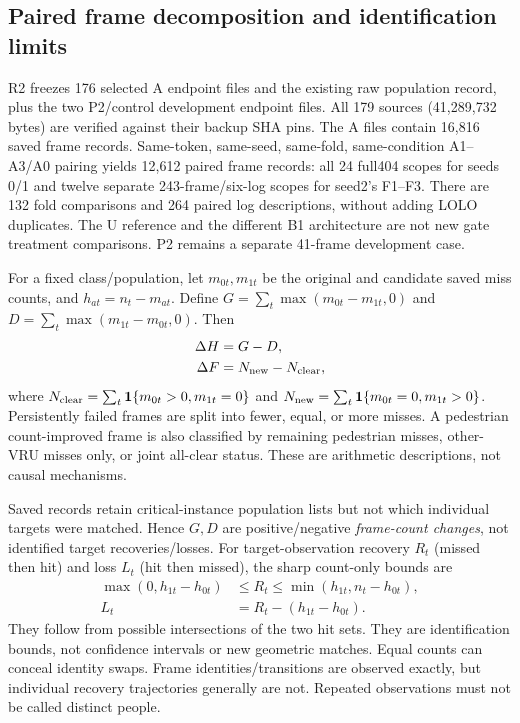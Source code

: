 \documentclass[conference]{IEEEtran}
\begin{document}
\subsection{Paired frame decomposition and identification limits}
R2 freezes 176 selected A endpoint files and the existing raw population record, plus the two P2/control development endpoint files. All 179 sources (41,289,732 bytes) are verified against their backup SHA pins. The A files contain 16,816 saved frame records. Same-token, same-seed, same-fold, same-condition A1--A3/A0 pairing yields 12,612 paired frame records: all 24 full404 scopes for seeds 0/1 and twelve separate 243-frame/six-log scopes for seed2's F1--F3. There are 132 fold comparisons and 264 paired log descriptions, without adding LOLO duplicates. The U reference and the different B1 architecture are not new gate treatment comparisons. P2 remains a separate 41-frame development case.

For a fixed class/population, let $m_{0t},m_{1t}$ be the original and candidate saved miss counts, and $h_{at}=n_t-m_{at}$. Define $G=\sum_t\max(m_{0t}-m_{1t},0)$ and $D=\sum_t\max(m_{1t}-m_{0t},0)$. Then
\begin{align}
\Delta H &= G-D,\\
\Delta F &= N_{\rm new}-N_{\rm clear},
\end{align}
where $N_{\rm clear}=\sum_t\mathbf{1}\{m_{0t}>0,m_{1t}=0\}$ and $N_{\rm new}=\sum_t\mathbf{1}\{m_{0t}=0,m_{1t}>0\}$. Persistently failed frames are split into fewer, equal, or more misses. A pedestrian count-improved frame is also classified by remaining pedestrian misses, other-VRU misses only, or joint all-clear status. These are arithmetic descriptions, not causal mechanisms.

Saved records retain critical-instance population lists but not which individual targets were matched. Hence $G,D$ are positive/negative \emph{frame-count changes}, not identified target recoveries/losses. For target-observation recovery $R_t$ (missed then hit) and loss $L_t$ (hit then missed), the sharp count-only bounds are
\begin{align}
\max(0,h_{1t}-h_{0t})&\le R_t\le\min(h_{1t},n_t-h_{0t}),\\
L_t&=R_t-(h_{1t}-h_{0t}).
\end{align}
They follow from possible intersections of the two hit sets. They are identification bounds, not confidence intervals or new geometric matches. Equal counts can conceal identity swaps. Frame identities/transitions are observed exactly, but individual recovery trajectories generally are not. Repeated observations must not be called distinct people.
\end{document}

